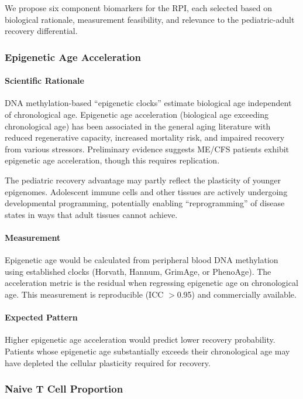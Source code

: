 We propose six component biomarkers for the RPI, each selected based on biological rationale, measurement feasibility, and relevance to the pediatric-adult recovery differential.

\subsubsection{Epigenetic Age Acceleration}

\paragraph{Scientific Rationale}
DNA methylation-based ``epigenetic clocks'' estimate biological age independent of chronological age. Epigenetic age acceleration (biological age exceeding chronological age) has been associated in the general aging literature with reduced regenerative capacity, increased mortality risk, and impaired recovery from various stressors. Preliminary evidence suggests ME/CFS patients exhibit epigenetic age acceleration, though this requires replication.

The pediatric recovery advantage may partly reflect the plasticity of younger epigenomes. Adolescent immune cells and other tissues are actively undergoing developmental programming, potentially enabling ``reprogramming'' of disease states in ways that adult tissues cannot achieve.

\paragraph{Measurement}
Epigenetic age would be calculated from peripheral blood DNA methylation using established clocks (Horvath, Hannum, GrimAge, or PhenoAge). The acceleration metric is the residual when regressing epigenetic age on chronological age. This measurement is reproducible (ICC $>$0.95) and commercially available.

\paragraph{Expected Pattern}
Higher epigenetic age acceleration would predict lower recovery probability. Patients whose epigenetic age substantially exceeds their chronological age may have depleted the cellular plasticity required for recovery.

\subsubsection{Naive T Cell Proportion}

